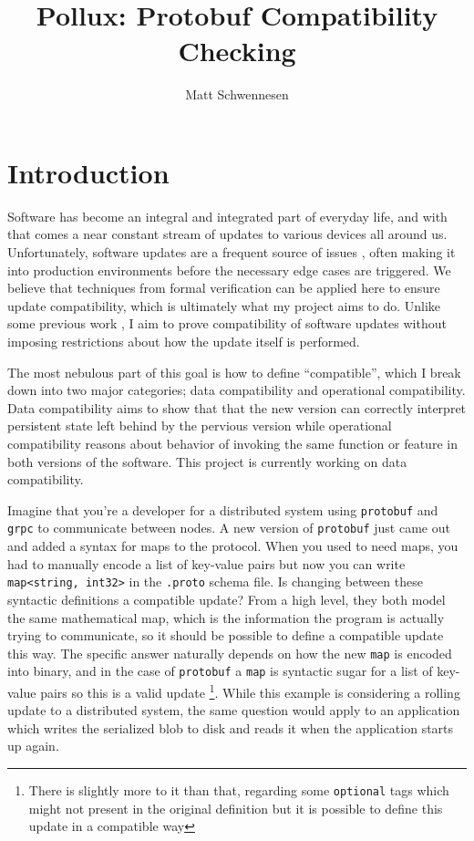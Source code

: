 \documentclass[11pt]{article}
\author{Matt Schwennesen}
\title{Pollux: Protobuf Compatibility Checking}
\date{}
\begin{document}
\maketitle
\tableofcontents

\section{Introduction}

Software has become an integral and integrated part of everyday life, and with
that comes a near constant stream of updates to various devices all around
us. Unfortunately, software updates are a frequent source of issues
\autocites{zhangUnderstandingDetectingSoftware2021}[][]{Gray1986WhyDC}, often
making it into production environments before the necessary edge cases are
triggered. We believe that techniques from formal verification can be applied
here to ensure update compatibility, which is ultimately what my project aims to
do. Unlike some previous work
\autocites{ajmaniModularSoftwareUpgrades2006}[][]{reitblattAbstractionsNetworkUpdate2012},
I aim to prove compatibility of software updates without imposing restrictions
about how the update itself is performed.

The most nebulous part of this goal is how to define ``compatible'', which I
break down into two major categories; data compatibility and operational
compatibility. Data compatibility aims to show that that the new version can
correctly interpret persistent state left behind by the pervious version while
operational compatibility reasons about behavior of invoking the same function
or feature in both versions of the software. This project is currently working
on data compatibility.

Imagine that you're a developer for a distributed system using \texttt{protobuf}
and \texttt{grpc} to communicate between nodes. A new version of
\texttt{protobuf} just came out and added a syntax for maps to the
protocol. When you used to need maps, you had to manually encode a list of
key-value pairs but now you can write \texttt{map<string, int32>} in the
\texttt{.proto} schema file. Is changing between these syntactic definitions a
compatible update? From a high level, they both model the same mathematical map,
which is the information the program is actually trying to communicate, so it
should be possible to define a compatible update this way. The specific answer
naturally depends on how the new \texttt{map} is encoded into binary, and in the
case of \texttt{protobuf} a \texttt{map} is syntactic sugar for a list of
key-value pairs so this is a valid update \footnote{There is slightly more to it
	than that, regarding some \texttt{optional} tags which might not present in
	the original definition but it is possible to define this update in a
	compatible way}. While this example is considering a rolling update to a
distributed system, the same question would apply to an application which writes
the serialized blob to disk and reads it when the application starts up again.
\end{document}
